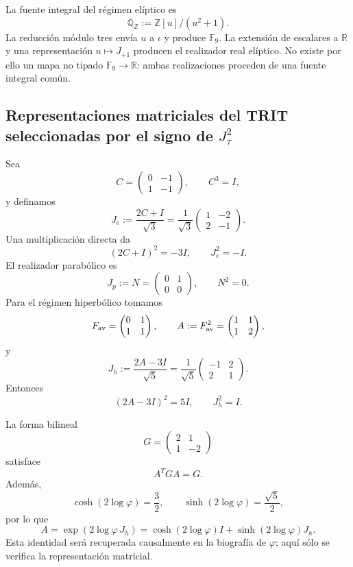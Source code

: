 La fuente integral del régimen elíptico es
\[
 \mathbb Q_{\mathbb Z}:=\mathbb Z[u]/(u^2+1).
\]
La reducción módulo tres envía \(u\) a \(\iota\) y produce
\(\mathbb F_9\). La extensión de escalares a \(\mathbb R\) y una
representación \(u\mapsto J_{+1}\) producen el realizador real elíptico.
No existe por ello un mapa no tipado \(\mathbb F_9\to\mathbb R\): ambas
realizaciones proceden de una fuente integral común.

\subsection{Representaciones matriciales del TRIT seleccionadas por el signo de \(J_\tau^2\)}

Sea
\[
 C=\begin{pmatrix}0&-1\\1&-1\end{pmatrix},
 \qquad C^3=I,
\]
y definamos
\[
 J_e:=\frac{2C+I}{\sqrt3}
 =\frac1{\sqrt3}\begin{pmatrix}1&-2\\2&-1\end{pmatrix}.
\]
Una multiplicación directa da
\[
 (2C+I)^2=-3I,
 \qquad J_e^2=-I.
\]
El realizador parabólico es
\[
 J_p:=N=\begin{pmatrix}0&1\\0&0\end{pmatrix},
 \qquad N^2=0.
\]
Para el régimen hiperbólico tomamos
\[
 F_{\rm av}=\begin{pmatrix}0&1\\1&1\end{pmatrix},
 \qquad
 A:=F_{\rm av}^2=\begin{pmatrix}1&1\\1&2\end{pmatrix},
\]
y
\[
 J_h:=\frac{2A-3I}{\sqrt5}
 =\frac1{\sqrt5}\begin{pmatrix}-1&2\\2&1\end{pmatrix}.
\]
Entonces
\[
 (2A-3I)^2=5I,
 \qquad J_h^2=I.
\]

La forma bilineal
\[
 G=\begin{pmatrix}2&1\\1&-2\end{pmatrix}
\]
satisface
\[
 A^TGA=G.
\]
Además,
\[
 \cosh(2\log\varphi)=\frac32,
 \qquad
 \sinh(2\log\varphi)=\frac{\sqrt5}{2},
\]
por lo que
\[
 A=\exp(2\log\varphi\,J_h)
  =\cosh(2\log\varphi)I+\sinh(2\log\varphi)J_h.
\]
Esta identidad será recuperada causalmente en la biografía de
\(\varphi\); aquí sólo se verifica la representación matricial.

